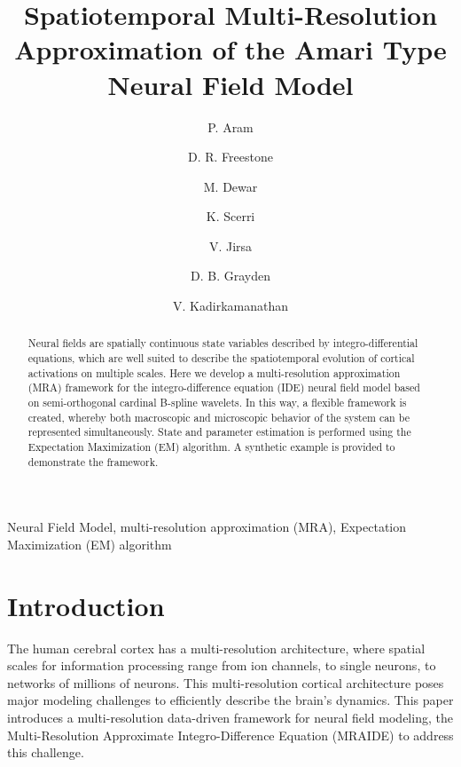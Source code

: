 \documentclass[review,authoryear,3p]{elsarticle}
\begin{document}
\begin{frontmatter}
\title{Spatiotemporal Multi-Resolution Approximation of the Amari Type Neural Field Model}
  
\author[TNG]{P. Aram}
\author[DEEE]{D. R. Freestone}
\author[CU]{M. Dewar}
\author[UM]{K. Scerri}
 \author[TNG]{V. Jirsa}
\author[DEEE]{D. B. Grayden}
\author[US]{V. Kadirkamanathan}

\address[TNG]{Theoretical Neuroscience Group, UMR 1106, Institut de Neurosciences des Systemes, 13385 Marseille, France}
\address[DEEE]{NeuroEngineering Laboratory, Department of Electrical and Electronic Engineering, University of Melbourne, Melbourne, VIC, Australia}
\address[CU]{bit.ly, New York City, USA}
\address[UM]{Department of Systems and Control Engineering, University of Malta, Msida, MSD, Malta}
 \address[US]{Department of Automatic Control and Systems Engineering, University of Sheffield, Sheffield, UK}


\begin{abstract}
Neural fields are spatially continuous state variables described by integro-differential equations, which are well suited to describe the spatiotemporal evolution of cortical activations on multiple scales. Here we develop a multi-resolution approximation (MRA) framework for the integro-difference equation (IDE) neural field model based on semi-orthogonal cardinal B-spline wavelets. In this way, a flexible framework is created, whereby both macroscopic and microscopic behavior of the system can be represented simultaneously. State and parameter estimation is performed using the Expectation Maximization (EM) algorithm. A synthetic example is provided
to demonstrate the framework.
\end{abstract} 
\begin{keyword}
  Neural Field Model, multi-resolution approximation (MRA), Expectation Maximization (EM) algorithm
\end{keyword}
\end{frontmatter}
\section{Introduction}
The human cerebral cortex has a multi-resolution architecture, where spatial scales for information processing range from ion channels, to single neurons, to networks of millions of neurons. This multi-resolution cortical architecture poses major modeling challenges to efficiently describe the brain's dynamics. This paper introduces a multi-resolution data-driven framework for neural field modeling, the Multi-Resolution Approximate Integro-Difference Equation (MRAIDE) to address this challenge. 
\end{document}
